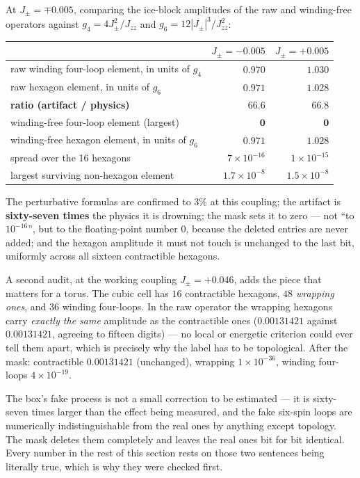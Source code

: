 \documentclass[11pt,a4paper]{article}
\newcommand{\Jpm}{J_{\pm}}
\newcommand{\Jzz}{J_{zz}}
\newcommand{\gfour}{g_4}
\newcommand{\gsix}{g_6}
\begin{document}
At $\Jpm=\mp0.005$, comparing the ice-block amplitudes of the raw and
winding-free operators against $\gfour=4\Jpm^2/\Jzz$ and
$\gsix=12|\Jpm|^3/\Jzz^2$:

\begin{center}
\small
\begin{tabular}{lrr}
\toprule
 & $\Jpm=-0.005$ & $\Jpm=+0.005$\\
\midrule
raw winding four-loop element, in units of $\gfour$ & $0.970$ & $1.030$\\
raw hexagon element, in units of $\gsix$ & $0.971$ & $1.028$\\
\textbf{ratio (artifact / physics)} & $\mathbf{66.6}$ & $\mathbf{66.8}$\\
\midrule
winding-free four-loop element (largest) & $\mathbf{0}$ & $\mathbf{0}$\\
winding-free hexagon element, in units of $\gsix$ & $0.971$ & $1.028$\\
spread over the 16 hexagons & $7\times10^{-16}$ & $1\times10^{-15}$\\
largest surviving non-hexagon element & $1.7\times10^{-8}$ & $1.5\times10^{-8}$\\
\bottomrule
\end{tabular}
\end{center}

The perturbative formulas are confirmed to $3\%$ at this coupling; the
artifact is \textbf{sixty-seven times} the physics it is drowning; the mask
sets it to zero --- not ``to $10^{-16}$'', but to the floating-point number
$0$, because the deleted entries are never added; and the hexagon amplitude
it must not touch is unchanged to the last bit, uniformly across all sixteen
contractible hexagons.

A second audit, at the working coupling $\Jpm=+0.046$, adds the piece that
matters for a torus.  The cubic cell has $16$ contractible hexagons,
\emph{$48$ wrapping ones}, and $36$ winding four-loops.  In the raw operator
the wrapping hexagons carry \emph{exactly the same} amplitude as the
contractible ones ($0.00131421$ against $0.00131421$, agreeing to fifteen
digits) --- no local or energetic criterion could ever tell them apart,
which is precisely why the label has to be topological.  After the mask:
contractible $0.00131421$ (unchanged), wrapping $1\times10^{-36}$, winding
four-loops $4\times10^{-19}$.

\begin{plainwords}
The box's fake process is not a small correction to be estimated --- it is
sixty-seven times larger than the effect being measured, and the fake
six-spin loops are numerically indistinguishable from the real ones by
anything except topology.  The mask deletes them completely and leaves the
real ones bit for bit identical.  Every number in the rest of this section
rests on those two sentences being literally true, which is why they were
checked first.
\end{plainwords}
\end{document}
